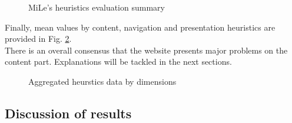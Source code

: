 \begin{figure}[!ht]
    \begin{minipage}{\linewidth}
        \centering
        \captionsetup{justification=centering}
        \caption{MiLe's heuristics evaluation summary}
        \label{BarsMileCrop}
    \end{minipage}
\end{figure}

\pagebreak

Finally, mean values by content, navigation and presentation heuristics are provided in Fig. \ref{BarsAggregated}.\\
There is an overall consensus that the website presents major problems on the content part. Explanations will be tackled in the next sections. 

\begin{figure}[!ht]
    \begin{minipage}{\linewidth}
        \centering
        \captionsetup{justification=centering}
        \caption{Aggregated heurstics data by dimensions}
        \label{BarsAggregated}
    \end{minipage}
\end{figure}

\subsection{Discussion of results}

